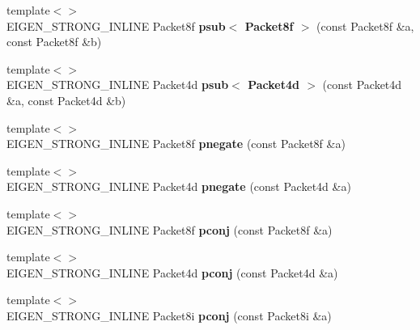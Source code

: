 \begin{DoxyCompactItemize}
\item 
\mbox{\label{namespace_eigen_1_1internal_a44b023080fe2bab9277715ba0688dca0}} 
{\footnotesize template$<$$>$ }\\E\+I\+G\+E\+N\+\_\+\+S\+T\+R\+O\+N\+G\+\_\+\+I\+N\+L\+I\+NE Packet8f {\bfseries psub$<$ Packet8f $>$} (const Packet8f \&a, const Packet8f \&b)
\item 
\mbox{\label{namespace_eigen_1_1internal_af1ba7ed52219374cc34f9ac2baa0c319}} 
{\footnotesize template$<$$>$ }\\E\+I\+G\+E\+N\+\_\+\+S\+T\+R\+O\+N\+G\+\_\+\+I\+N\+L\+I\+NE Packet4d {\bfseries psub$<$ Packet4d $>$} (const Packet4d \&a, const Packet4d \&b)
\item 
\mbox{\label{namespace_eigen_1_1internal_af1c3650c47d06c1b68a7f32674ed5a6a}} 
{\footnotesize template$<$$>$ }\\E\+I\+G\+E\+N\+\_\+\+S\+T\+R\+O\+N\+G\+\_\+\+I\+N\+L\+I\+NE Packet8f {\bfseries pnegate} (const Packet8f \&a)
\item 
\mbox{\label{namespace_eigen_1_1internal_a80485a08aec923ff377c240d3b46da0e}} 
{\footnotesize template$<$$>$ }\\E\+I\+G\+E\+N\+\_\+\+S\+T\+R\+O\+N\+G\+\_\+\+I\+N\+L\+I\+NE Packet4d {\bfseries pnegate} (const Packet4d \&a)
\item 
\mbox{\label{namespace_eigen_1_1internal_a73fba9b75766833d6d5ca43fc3a07b67}} 
{\footnotesize template$<$$>$ }\\E\+I\+G\+E\+N\+\_\+\+S\+T\+R\+O\+N\+G\+\_\+\+I\+N\+L\+I\+NE Packet8f {\bfseries pconj} (const Packet8f \&a)
\item 
\mbox{\label{namespace_eigen_1_1internal_a6ac96581a6dd2086aba70cb09610bec4}} 
{\footnotesize template$<$$>$ }\\E\+I\+G\+E\+N\+\_\+\+S\+T\+R\+O\+N\+G\+\_\+\+I\+N\+L\+I\+NE Packet4d {\bfseries pconj} (const Packet4d \&a)
\item 
\mbox{\label{namespace_eigen_1_1internal_aeb8ca5b06e0427cc7c8d0bd7df10336c}} 
{\footnotesize template$<$$>$ }\\E\+I\+G\+E\+N\+\_\+\+S\+T\+R\+O\+N\+G\+\_\+\+I\+N\+L\+I\+NE Packet8i {\bfseries pconj} (const Packet8i \&a)

\end{DoxyCompactItemize}
